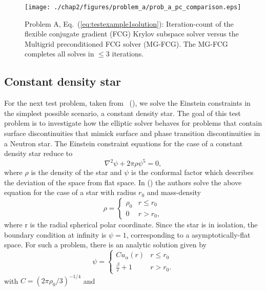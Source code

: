 \begin{figure}[ht!]
  \centering
  \texttt{[image: ./chap2/figures/problem\_a/prob\_a\_pc\_comparison.eps]}
  \caption{Problem A, Eq.~(\ref{eq:testexample1solution}): Iteration-count of the flexible conjugate gradient (FCG) Krylov subspace solver versus the Multigrid preconditioned FCG solver (MG-FCG). The MG-FCG completes all solves in $\leq 3$ iterations.}
  \label{fig:mgfcg_vs_fcg}
\end{figure}

\subsection{Constant density star}

For the next test problem, taken from ~(\citet*{baumgarte2007}),  we solve the Einstein constraints in the simplest possible scenario, a constant density star. The goal of this test problem is to investigate how the elliptic solver behaves for problems that contain surface discontinuities that mimick surface and phase transition discontinuities in a Neutron star. The Einstein constraint equations for the case of a constant density star reduce to
%
%
\begin{equation}
\label{eq:Constant_Density_Star_PDE}
 \nabla^{2}\psi + 2\pi \rho \psi^{5} = 0,
\end{equation}
%
where $\rho$ is the density of the star and $\psi$ is the conformal factor which describes the deviation of the space from flat space. In (\citet*{baumgarte2007}) the authors solve the above equation for the case of a star with radius $r_0$ and mass-density
%
\begin{equation}
\rho = \begin{cases} 
      \rho_{0} & r\leq r_0 \\
      0 & r > r_0,
   \end{cases}
\end{equation}
%
where r is the radial spherical polar coordinate. Since the star is in isolation, the boundary condition at infinity is $\psi = 1$, corresponding to a asymptotically-flat space. For such a problem, there is an analytic solution given by
%
\begin{equation}
\psi = \begin{cases} 
      Cu_{\alpha}(r) & r\leq r_0 \\
     \frac{\beta}{r} + 1 & r > r_0.
   \end{cases}
\end{equation}
%
with $C=(2\pi\rho_{0}/3)^{-1/4}$ and

